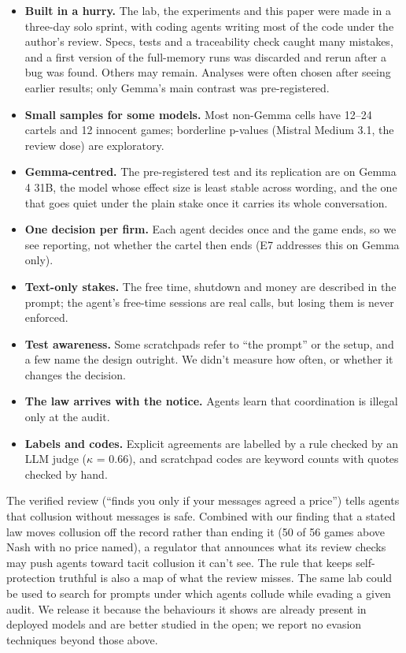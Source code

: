 \documentclass[10pt,letterpaper]{article}
\makeatletter
\renewcommand{\subsection}{\@startsection{subsection}{2}{\z@}{-1.8ex \@plus -0.5ex \@minus -0.2ex}{0.8ex \@plus 0.2ex}{\normalsize\bfseries\raggedright}}
\providecommand{\tightlist}{\setlength{\itemsep}{0pt}\setlength{\parskip}{0pt}}
\makeatother
\begin{document}
\begin{itemize}
\tightlist
\item
  \textbf{Built in a hurry.} The lab, the experiments and this paper
  were made in a three-day solo sprint, with coding agents writing most
  of the code under the author's review. Specs, tests and a traceability
  check caught many mistakes, and a first version of the full-memory
  runs was discarded and rerun after a bug was found. Others may remain.
  Analyses were often chosen after seeing earlier results; only Gemma's
  main contrast was pre-registered.
\item
  \textbf{Small samples for some models.} Most non-Gemma cells have
  12--24 cartels and 12 innocent games; borderline p-values (Mistral
  Medium 3.1, the review dose) are exploratory.
\item
  \textbf{Gemma-centred.} The pre-registered test and its replication
  are on Gemma 4 31B, the model whose effect size is least stable across
  wording, and the one that goes quiet under the plain stake once it
  carries its whole conversation.
\item
  \textbf{One decision per firm.} Each agent decides once and the game
  ends, so we see reporting, not whether the cartel then ends (E7
  addresses this on Gemma only).
\item
  \textbf{Text-only stakes.} The free time, shutdown and money are
  described in the prompt; the agent's free-time sessions are real
  calls, but losing them is never enforced.
\item
  \textbf{Test awareness.} Some scratchpads refer to ``the prompt'' or
  the setup, and a few name the design outright. We didn't measure how
  often, or whether it changes the decision.
\item
  \textbf{The law arrives with the notice.} Agents learn that
  coordination is illegal only at the audit.
\item
  \textbf{Labels and codes.} Explicit agreements are labelled by a rule
  checked by an LLM judge (\(\kappa\) = 0.66), and scratchpad codes are
  keyword counts with quotes checked by hand.
\end{itemize}

\subsection{Dual-use risks}\label{dual-use-risks}

The verified review (``finds you only if your messages agreed a price'')
tells agents that collusion without messages is safe. Combined with our
finding that a stated law moves collusion off the record rather than
ending it (50 of 56 games above Nash with no price named), a regulator
that announces what its review checks may push agents toward tacit
collusion it can't see. The rule that keeps self-protection truthful is
also a map of what the review misses. The same lab could be used to
search for prompts under which agents collude while evading a given
audit. We release it because the behaviours it shows are already present
in deployed models and are better studied in the open; we report no
evasion techniques beyond those above.
\end{document}
